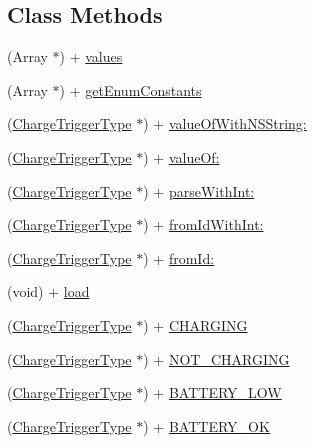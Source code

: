 \subsection*{Class Methods}
\begin{DoxyCompactItemize}
\item 
(Array $\ast$) + \hyperlink{interface_charge_trigger_type_a770dd7f22c689211ff8bbf31094b3fc3}{values}
\item 
(Array $\ast$) + \hyperlink{interface_charge_trigger_type_a0dbde9e50077ce3fc9b91d8099727322}{get\+Enum\+Constants}
\item 
(\hyperlink{interface_charge_trigger_type}{Charge\+Trigger\+Type} $\ast$) + \hyperlink{interface_charge_trigger_type_a159321870b86e6ad676d461ac9d6e54d}{value\+Of\+With\+N\+S\+String\+:}
\item 
(\hyperlink{interface_charge_trigger_type}{Charge\+Trigger\+Type} $\ast$) + \hyperlink{interface_charge_trigger_type_aa1592c822bbb13a6321af56a45d34af2}{value\+Of\+:}
\item 
(\hyperlink{interface_charge_trigger_type}{Charge\+Trigger\+Type} $\ast$) + \hyperlink{interface_charge_trigger_type_ad77140241a9263cce9186cb5c6571f9f}{parse\+With\+Int\+:}
\item 
(\hyperlink{interface_charge_trigger_type}{Charge\+Trigger\+Type} $\ast$) + \hyperlink{interface_charge_trigger_type_a9786738684e268e32a85702d1863ece4}{from\+Id\+With\+Int\+:}
\item 
(\hyperlink{interface_charge_trigger_type}{Charge\+Trigger\+Type} $\ast$) + \hyperlink{interface_charge_trigger_type_a5a50c15f3aface7689b5bec01e61a484}{from\+Id\+:}
\item 
(void) + \hyperlink{interface_charge_trigger_type_aa7d91eba411245e01741a02c6d59c710}{load}
\item 
(\hyperlink{interface_charge_trigger_type}{Charge\+Trigger\+Type} $\ast$) + \hyperlink{interface_charge_trigger_type_ab049d3c4f727b2952d9a379eb0d79929}{C\+H\+A\+R\+G\+I\+N\+G}
\item 
(\hyperlink{interface_charge_trigger_type}{Charge\+Trigger\+Type} $\ast$) + \hyperlink{interface_charge_trigger_type_adbe3e97ca434e4cc103194a261118295}{N\+O\+T\+\_\+\+C\+H\+A\+R\+G\+I\+N\+G}
\item 
(\hyperlink{interface_charge_trigger_type}{Charge\+Trigger\+Type} $\ast$) + \hyperlink{interface_charge_trigger_type_ab1a40ffd1e9830bd9dc54bc5c55f387f}{B\+A\+T\+T\+E\+R\+Y\+\_\+\+L\+O\+W}
\item 
(\hyperlink{interface_charge_trigger_type}{Charge\+Trigger\+Type} $\ast$) + \hyperlink{interface_charge_trigger_type_a3665b6e02ea5679dadf5f819fbbcbc05}{B\+A\+T\+T\+E\+R\+Y\+\_\+\+O\+K}
\end{DoxyCompactItemize}


